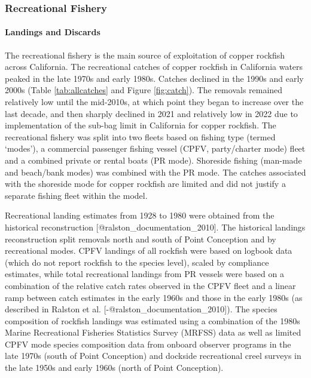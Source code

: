 \documentclass[11pt,
  letterpaper,
]{article}
\begin{document}
\subsubsection{Recreational Fishery}\label{recreational-fishery}

\paragraph{Landings and Discards}\label{landings-and-discards-1}

\hfill\break

The recreational fishery is the main source of exploitation of copper rockfish across California. The recreational catches of copper rockfish in California waters peaked in the late 1970s and early 1980s. Catches declined in the 1990s and early 2000s (Table \ref{tab:allcatches} and Figure \ref{fig:catch}). The removals remained relatively low until the mid-2010s, at which point they began to increase over the last decade, and then sharply declined in 2021 and relatively low in 2022 due to implementation of the sub-bag limit in California for copper rockfish. The recreational fishery was split into two fleets based on fishing type (termed `modes'), a commercial passenger fishing vessel (CPFV, party/charter mode) fleet and a combined private or rental boats (PR mode). Shoreside fishing (man-made and beach/bank modes) was combined with the PR mode. The catches associated with the shoreside mode for copper rockfish are limited and did not justify a separate fishing fleet within the model.

Recreational landing estimates from 1928 to 1980 were obtained from the historical reconstruction {[}@ralston\_documentation\_2010{]}. The historical landings reconstruction split removals north and south of Point Conception and by recreational modes. CPFV landings of all rockfish were based on logbook data (which do not report rockfish to the species level), scaled by compliance estimates, while total recreational landings from PR vessels were based on a combination of the relative catch rates observed in the CPFV fleet and a linear ramp between catch estimates in the early 1960s and those in the early 1980s (as described in Ralston et al. {[}-@ralston\_documentation\_2010{]}). The species composition of rockfish landings was estimated using a combination of the 1980s Marine Recreational Fisheries Statistics Survey (MRFSS) data as well as limited CPFV mode species composition data from onboard observer programs in the late 1970s (south of Point Conception) and dockside recreational creel surveys in the late 1950s and early 1960s (north of Point Conception).
\end{document}
